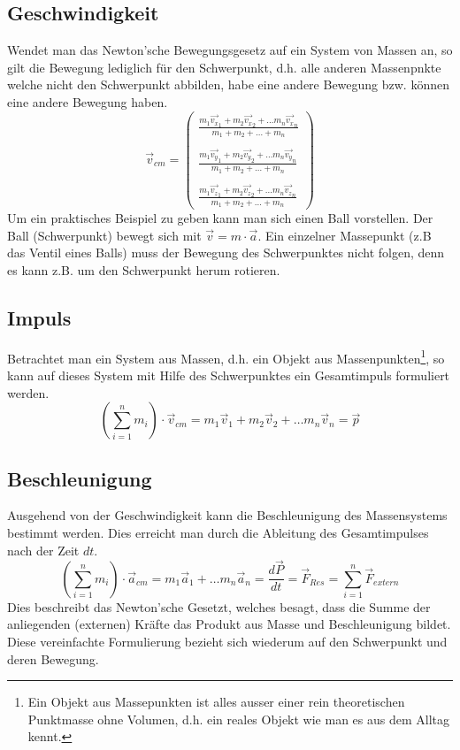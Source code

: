 \subsection{Geschwindigkeit}
Wendet man das Newton'sche Bewegungsgesetz auf ein System von
Massen an, so gilt die Bewegung lediglich für den Schwerpunkt,
d.h. alle anderen Massenpnkte welche nicht den Schwerpunkt abbilden,
habe eine andere Bewegung bzw. können eine andere Bewegung haben.
\[ \boxed{ \vec{v}_{cm} = 
	\begin{pmatrix} 
		\frac{m_1 \vec{v_x}_1 
			+ m_2 \vec{v_x}_2 
			+ \dots m_n \vec{v_x}_n}
			{m_1 + m_2 + \dots + m_n} \\
		\\
		\frac{m_1 \vec{v_y}_1 
			+ m_2 \vec{v_y}_2 
			+ \dots m_n \vec{v_y}_n}
			{m_1 + m_2 + \dots + m_n} \\
		\\
		\frac{m_1 \vec{v_z}_1 
			+ m_2 \vec{v_z}_2 
			+ \dots m_n \vec{v_z}_n}
			{m_1 + m_2 + \dots + m_n}
	\end{pmatrix} }
\]
Um ein praktisches Beispiel zu geben kann man sich einen Ball vorstellen.
Der Ball (Schwerpunkt) bewegt sich mit $\vec{v} = m \cdot \vec{a}$.
Ein einzelner Massepunkt (z.B das Ventil eines Balls) muss der Bewegung
des Schwerpunktes nicht folgen, denn es kann z.B. um den Schwerpunkt 
herum rotieren.

\subsection{Impuls}
Betrachtet man ein System aus Massen, d.h. ein Objekt aus 
Massenpunkten\footnote{Ein Objekt aus Massepunkten ist alles ausser 
einer rein theoretischen Punktmasse ohne Volumen, d.h. ein reales Objekt
wie man es aus dem Alltag kennt.}, so kann
auf dieses System mit Hilfe des Schwerpunktes ein Gesamtimpuls
formuliert werden.
\[ \boxed{
	\left( \sum_{i=1}^n m_i \right) \cdot \vec{v}_{cm} 
		= m_1 \vec{v}_1 + m_2 \vec{v}_2 + \dots m_n \vec{v}_n
		=\vec{p} }
\]

\subsection{Beschleunigung}
Ausgehend von der Geschwindigkeit kann die Beschleunigung des 
Massensystems bestimmt werden. Dies erreicht man durch die 
Ableitung des Gesamtimpulses nach der Zeit $dt$.
\[ \boxed{
	\left( \sum_{i=1}^n m_i \right) \cdot \vec{a}_{cm} 
		= m_1 \vec{a}_1 + \dots m_n \vec{a}_n
		= \frac{d \vec{P}}{dt} 
		= \vec{F}_{Res}
		= \sum_{i=1}^n \vec{F}_{extern} }
\]
Dies beschreibt das Newton'sche Gesetzt, welches besagt, dass die 
Summe der anliegenden (externen) Kräfte das Produkt aus Masse und
Beschleunigung bildet. Diese vereinfachte Formulierung bezieht sich
wiederum auf den Schwerpunkt und deren Bewegung.


